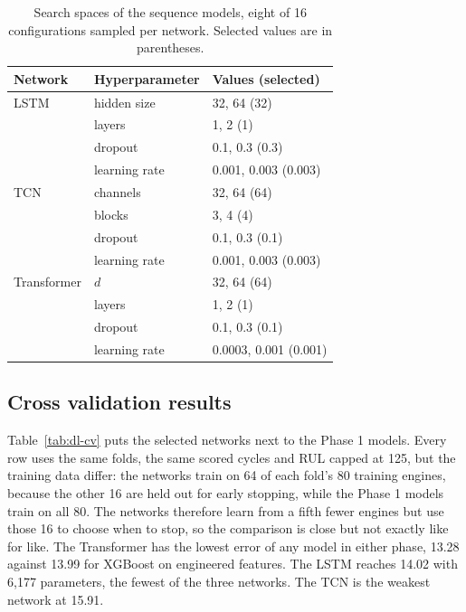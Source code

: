 \begin{table}[t]
\centering
\caption{Search spaces of the sequence models, eight of 16 configurations
sampled per network. Selected values are in parentheses.}
\label{tab:dl-search}
\footnotesize
\begin{tabular}{llp{3.2cm}}
\hline
Network & Hyperparameter & Values (selected) \\
\hline
LSTM & hidden size & 32, 64 (32) \\
 & layers & 1, 2 (1) \\
 & dropout & 0.1, 0.3 (0.3) \\
 & learning rate & 0.001, 0.003 (0.003) \\
\hline
TCN & channels & 32, 64 (64) \\
 & blocks & 3, 4 (4) \\
 & dropout & 0.1, 0.3 (0.1) \\
 & learning rate & 0.001, 0.003 (0.003) \\
\hline
Transformer & $d$ & 32, 64 (64) \\
 & layers & 1, 2 (1) \\
 & dropout & 0.1, 0.3 (0.1) \\
 & learning rate & 0.0003, 0.001 (0.001) \\
\hline
\end{tabular}
\end{table}

\subsection{Cross validation results}
Table~\ref{tab:dl-cv} puts the selected networks next to the Phase 1
models. Every row uses the same folds, the same scored cycles and RUL
capped at 125, but the training data differ: the networks train on 64 of
each fold's 80 training engines, because the other 16 are held out for
early stopping, while the Phase 1 models train on all 80. The networks
therefore learn from a fifth fewer engines but use those 16 to choose when
to stop, so the comparison is close but not exactly like for like. The
Transformer has the lowest error of any model in either
phase, 13.28 against 13.99 for XGBoost on engineered features. The LSTM
reaches 14.02 with 6{,}177 parameters, the fewest of the three networks.
The TCN is the weakest network at 15.91.

